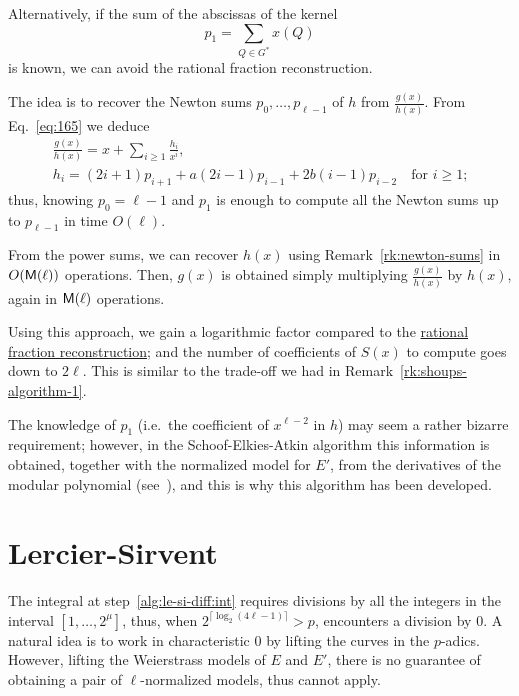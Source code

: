 \begin{remark}
  \label{rk:bmss}
  Alternatively, if the sum of the abscissas of the kernel
  \begin{equation}
    \label{eq:182}
    p_1 = \sum_{Q\in G^\ast}x(Q)
  \end{equation}
  is known, we can avoid the rational fraction reconstruction.

  The idea is to recover the Newton sums $p_0,\ldots,p_{\ell-1}$ of
  $h$ from $\frac{g(x)}{h(x)}$. From Eq.~\eqref{eq:165} we deduce
  \begin{equation}
    \label{eq:181}
    \begin{gathered}
      \frac{g(x)}{h(x)} = x + \sum_{i\ge1}\frac{h_i}{x^i}\text{,}\\
      h_i = (2i+1)p_{i+1} + a(2i-1)p_{i-1} + 2b(i-1)p_{i-2}
      \quad\text{for $i\ge1$;}
    \end{gathered}
  \end{equation}
  thus, knowing $p_0=\ell-1$ and $p_1$ is enough to compute all the
  Newton sums up to $p_{\ell-1}$ in time $O(\ell)$.

  From the power sums, we can recover $h(x)$ using
  Remark~\ref{rk:newton-sums} in $O(\mathsf{M}(\ell))$ operations. Then,
  $g(x)$ is obtained simply multiplying $\frac{g(x)}{h(x)}$ by $h(x)$,
  again in $\mathsf{M}(\ell)$ operations.

  Using this approach, we gain a logarithmic factor compared to the
  \hyperref[sec:eucl-algor-rati]{rational fraction reconstruction};
  and the number of coefficients of $S(x)$ to compute goes down to
  $2\ell$. This is similar to the trade-off we had in
  Remark~\ref{rk:shoups-algorithm-1}.

    The knowledge of $p_1$
  (i.e.\ the coefficient of $x^{\ell-2}$ in $h$) may seem a rather
  bizarre requirement; however, in the Schoof-Elkies-Atkin algorithm
  this information is obtained, together with the normalized model for
  $E'$, from the derivatives of the modular polynomial
  (see~\cite{elkies98,morain95}), and this is why this algorithm has
  been developed.
\end{remark}



\section{Lercier-Sirvent}
\label{sec:lercier-sirvent}
The integral at step~\ref{alg:le-si-diff:int} requires divisions by
all the integers in the interval $[1,\ldots,2^\mu]$, thus, when
$2^{\lceil\log_2(4\ell-1)\rceil}>p$, \hyperref[alg:bmss]{}
encounters a division by $0$. A natural idea is to work in
characteristic $0$ by lifting the curves in the $p$-adics. However,
lifting the Weierstrass models of $E$ and $E'$, there is no guarantee
of obtaining a pair of $\ell$-normalized models, thus
\hyperref[alg:bmss]{} cannot apply.


